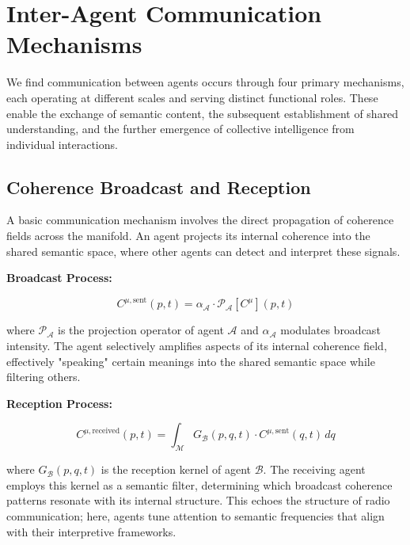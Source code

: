 
\section{Inter-Agent Communication Mechanisms}
\label{14.3:inter_agent_communication_mechanisms}

We find communication between agents occurs through four primary mechanisms, each operating at different scales and serving distinct functional roles. These enable the exchange of semantic content, the subsequent establishment of shared understanding, and the further emergence of collective intelligence from individual interactions.


\subsection{Coherence Broadcast and Reception}
\label{14.3.1:coherence_broadcast_and_reception}

A basic communication mechanism involves the direct propagation of coherence fields across the manifold. An agent projects its internal coherence into the shared semantic space, where other agents can detect and interpret these signals.

\textbf{Broadcast Process:}

\begin{equation}
C^{\mu, \mathrm{sent}}(p,t) = \alpha_{\mathcal{A}} \cdot \mathcal{P}_{\mathcal{A}}[C^\mu](p,t)
\end{equation}

where \(\mathcal{P}_{\mathcal{A}}\) is the projection operator of agent \(\mathcal{A}\) and \(\alpha_{\mathcal{A}}\) modulates broadcast intensity. The agent selectively amplifies aspects of its internal coherence field, effectively "speaking" certain meanings into the shared semantic space while filtering others.

\textbf{Reception Process:}

\begin{equation}
C^{\mu, \mathrm{received}}(p,t) = \int_{\mathcal{M}} G_{\mathcal{B}}(p,q,t) \cdot C^{\mu, \mathrm{sent}}(q,t) \, dq
\end{equation}

where \(G_{\mathcal{B}}(p,q,t)\) is the reception kernel of agent \(\mathcal{B}\). The receiving agent employs this kernel as a semantic filter, determining which broadcast coherence patterns resonate with its internal structure. This echoes the structure of radio communication; here, agents tune attention to semantic frequencies that align with their interpretive frameworks.

